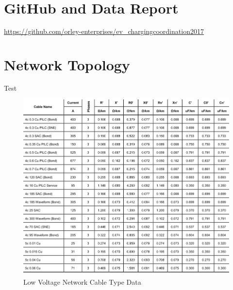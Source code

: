 \chapter{GitHub and Data Report}

\url{https://github.com/orley-enterprises/ev_chargingcoordination2017}

\chapter{Network Topology}
\label{app:networktopology}

\setcounter{equation}{0}
Test
\begin{figure}[]
	\includegraphics[width=\textwidth,trim={0cm 0cm 0cm 0cm}, clip]{figures/app_network/linecodes2}
	\caption{Low Voltage Network Cable Type Data \cite{ENWL2017}}
	\label{fig:linecodes2}
\end{figure}

